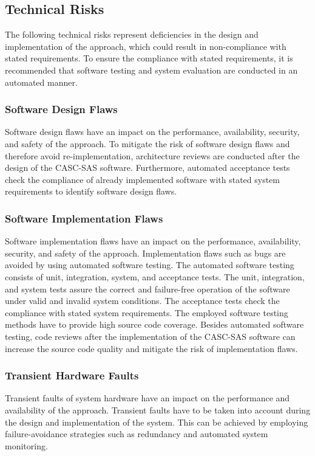 \subsection{Technical Risks}
\label{sec:risk_assessment_technical}
The following technical risks represent deficiencies in the design and implementation of the approach, which could result in non-compliance with stated requirements.
To ensure the compliance with stated requirements, it is recommended that software testing and system evaluation are conducted in an automated manner.

\subsubsection{Software Design Flaws}
Software design flaws have an impact on the performance, availability, security, and safety of the approach.
To mitigate the risk of software design flaws and therefore avoid re-implementation, architecture reviews are conducted after the design of the CASC-SAS software.
Furthermore, automated acceptance tests check the compliance of already implemented software with stated system requirements to identify software design flaws.

\subsubsection{Software Implementation Flaws}
Software implementation flaws have an impact on the performance, availability, security, and safety of the approach.
Implementation flaws such as bugs are avoided by using automated software testing.
The automated software testing consists of unit, integration, system, and acceptance tests.
The unit, integration, and system tests assure the correct and failure-free operation of the software under valid and invalid system conditions.
The acceptance tests check the compliance with stated system requirements.
The employed software testing methods have to provide high source code coverage.
Besides automated software testing, code reviews after the implementation of the CASC-SAS software can increase the source code quality and mitigate the risk of implementation flaws.

\subsubsection{Transient Hardware Faults}
Transient faults of system hardware have an impact on the performance and availability of the approach.
Transient faults have to be taken into account during the design and implementation of the system.
This can be achieved by employing failure-avoidance strategies such as redundancy and automated system monitoring.

